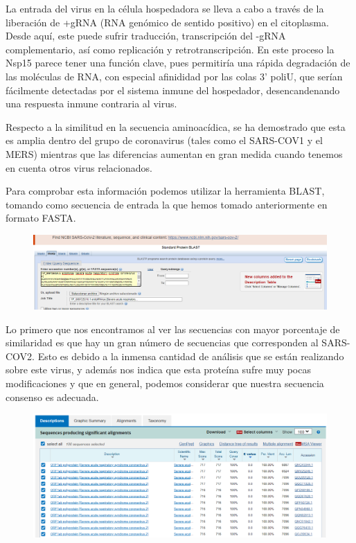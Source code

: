\documentclass[12pt]{article}
\begin{document}
La entrada del virus en la célula hospedadora se lleva a cabo a través de la liberación de +gRNA (RNA genómico de sentido positivo) en el citoplasma. Desde aquí, este puede sufrir traducción, transcripción del -gRNA complementario, así como replicación y retrotranscripción. En este proceso la Nsp15 parece tener una función clave, pues permitiría una rápida degradación de las moléculas de RNA, con especial afinididad por las colas 3' poliU, que serían fácilmente detectadas por el sistema inmune del hospedador, desencandenando una respuesta inmune contraria al virus. 
\newline

Respecto a la similitud en la secuencia aminoacídica, se ha demostrado que esta es amplia dentro del grupo de coronavirus (tales como el SARS-COV1 y el MERS) mientras que las diferencias aumentan en gran medida cuando tenemos en cuenta otros virus relacionados.
\newline

Para comprobar esta información podemos utilizar la herramienta BLAST, tomando como secuencia de entrada la que hemos tomado anteriormente en formato FASTA.
\newline

\begin{figure}[H]
\centering
\includegraphics[width=1.2\textwidth]{Screenshot_7}
\end{figure}

Lo primero que nos encontramos al ver las secuencias con mayor porcentaje de similaridad es que hay un gran número de secuencias que corresponden al SARS-COV2. Esto es debido a la inmensa cantidad de análisis que se están realizando sobre este virus, y además nos indica que esta proteína sufre muy pocas modificaciones y que en general, podemos considerar que nuestra secuencia consenso es adecuada.
\newline
\begin{figure}[H]
\centering
\includegraphics[width=1.2\textwidth]{Screenshot_8}
\end{figure}
\end{document}
